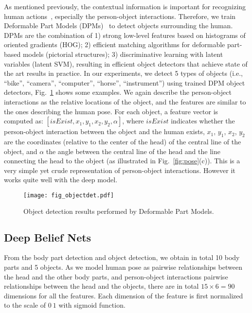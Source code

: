 \documentclass{article}
\begin{document}
As mentioned previously, the contextual information is important for recognizing human actions~\cite{LinGrammar}, especially the person-object interactions.  Therefore, we train Deformable Part Models (DPMs)~\cite{Felzenszwalb10} to detect objects surrounding the human.  DPMs are the combination of 1) strong low-level features based on histograms of oriented gradients (HOG); 2) efficient matching algorithms for deformable part-based models (pictorial structures); 3) discriminative learning with latent variables (latent SVM), resulting in efficient object detectors that achieve state of the art results in practice.  In our experiments, we detect 5 types of objects (i.e., ``bike'', ``camera'', ``computer'', ``horse'', ``instrument'') using trained DPM object detectors, Fig.~\ref{fig:objectdet} shows some examples.  We again describe the person-object interactions as the relative locations of the object, and the features are similar to the ones describing the human pose.  For each object, a feature vector is computed as: $[isExist,x_1,y_1,x_2,y_2,\alpha]$, where $isExist$ indicates whether the person-object interaction between the object and the human exists, $x_1$, $y_1$, $x_2$, $y_2$ are the coordinates (relative to the center of the head) of the central line of the object, and $\alpha$ the angle between the central line of the head and the line connecting the head to the object (as illustrated in Fig.~\ref{fig:pose}(c)).  This is a very simple yet crude representation of person-object interactions.  However it works quite well with the deep model.

\begin{figure}[phtb]
\centering
\texttt{[image: fig\_objectdet.pdf]}
\vspace{-8mm}
\caption{Object detection results performed by Deformable Part Models.}
\label{fig:objectdet}
\end{figure}

\subsection{Deep Belief Nets}

From the body part detection and object detection, we obtain in total 10 body parts and 5 objects.  As we model human pose as pairwise relationships between the head and the other body parts, and person-object interactions pairwise relationships between the head and the objects, there are in total $15\times6=90$ dimensions for all the features.  Each dimension of the feature is first normalized to the scale of $0 ~ 1$ with sigmoid function.
\end{document}
